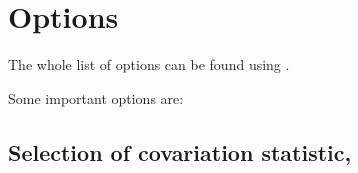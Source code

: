 
\section{Options}
\label{section:options}
\setcounter{footnote}{0}

The whole list of options can be found using .

Some important options are:

\subsection{Selection of covariation statistic, }

\subsection{}

\subsection{}

\subsection{}

\subsection{}


\subsection{}

\subsection{}












